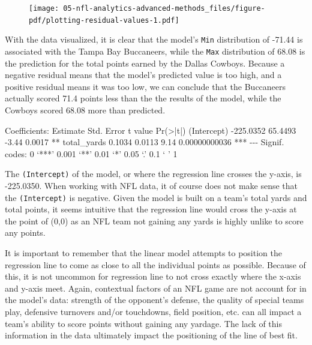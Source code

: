 \documentclass[
  letterpaper,
]{krantz}
\newenvironment{Shaded}{\begin{snugshade}}{\end{snugshade}}
\newcommand{\AttributeTok}[1]{\textcolor[rgb]{0.40,0.45,0.13}{#1}}
\newcommand{\StringTok}[1]{\textcolor[rgb]{0.13,0.47,0.30}{#1}}
\begin{document}
\begin{figure}[H]

{\centering \texttt{[image: 05-nfl-analytics-advanced-methods\_files/figure-pdf/plotting-residual-values-1.pdf]}

}

\end{figure}

With the data visualized, it is clear that the model's \texttt{Min}
distribution of -71.44 is associated with the Tampa Bay Buccaneers,
while the \texttt{Max} distribution of 68.08 is the prediction for the
total points earned by the Dallas Cowboys. Because a negative residual
means that the model's predicted value is too high, and a positive
residual means it was too low, we can conclude that the Buccaneers
actually scored 71.4 points less than the the results of the model,
while the Cowboys scored 68.08 more than predicted.

\begin{Shaded}
\begin{Highlighting}[]
\StringTok{\textasciigrave{}}\AttributeTok{Coefficients:}
\AttributeTok{             Estimate Std. Error t value      Pr(\textgreater{}|t|)    }
\AttributeTok{(Intercept) {-}225.0352    65.4493   {-}3.44        0.0017 ** }
\AttributeTok{total\_yards    0.1034     0.0113    9.14 0.00000000036 ***}
\AttributeTok{{-}{-}{-}}
\AttributeTok{Signif. codes:  0 ‘***’ 0.001 ‘**’ 0.01 ‘*’ 0.05 ‘.’ 0.1 ‘ ’ 1}\StringTok{\textasciigrave{}}
\end{Highlighting}
\end{Shaded}

The \texttt{(Intercept)} of the model, or where the regression line
crosses the y-axis, is -225.0350. When working with NFL data, it of
course does not make sense that the \texttt{(Intercept)} is negative.
Given the model is built on a team's total yards and total points, it
seems intuitive that the regression line would cross the y-axis at the
point of (0,0) as an NFL team not gaining any yards is highly unlike to
score any points.

It is important to remember that the linear model attempts to position
the regression line to come as close to all the individual points as
possible. Because of this, it is not uncommon for regression line to not
cross exactly where the x-axis and y-axis meet. Again, contextual
factors of an NFL game are not account for in the model's data: strength
of the opponent's defense, the quality of special teams play, defensive
turnovers and/or touchdowns, field position, etc. can all impact a
team's ability to score points without gaining any yardage. The lack of
this information in the data ultimately impact the positioning of the
line of best fit.
\end{document}
